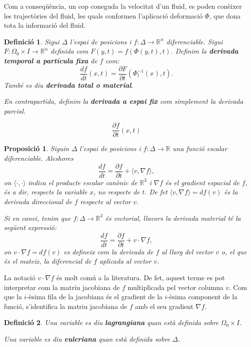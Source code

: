 \documentclass{article}
\numberwithin{equation}{section}
\newtheorem{definicio}{Definici\'{o}}[section]
\newtheorem{proposicio}{Proposici\'{o}}[section]
\begin{document}
Com a conseq\"{u}\`{e}ncia, un cop coneguda la velocitat d'un fluid, es poden con\`{e}ixer les traject\`{o}ries del fluid, les quals conformen l'aplicaci\'{o} deformaci\'{o} $\Phi$, que dona tota la informaci\'{o} del fluid.

\begin{definicio}\label{Def: derivada material}
Sigui $\Delta$ l'espai de posicions i $f:\Delta\rightarrow\mathbb{R}^n$ diferenciable. Sigui $F:\Omega_0\times I\rightarrow\mathbb{R}^n$ definida com $F(y,t)=f(\Phi(y,t),t)$. Definim la \textbf{derivada temporal a part\'{i}cula fixa} de $f$ com:
\[\frac{df}{dt}(x,t)=\frac{\partial F}{\partial t}(\Phi_t^{-1}(x),t).\]
Tamb\'{e} es diu \textbf{derivada total o material}.

En contrapartida, definim la \textbf{derivada a espai fix} com simplement la derivada parcial.

\[\frac{\partial f}{\partial t}(x,t)\]
\end{definicio}

\begin{proposicio}
Siguin $\Delta$ l'espai de posicions i $f:\Delta\rightarrow\mathbb{R}$ una funci\'{o} escalar diferenciable. Aleshores
\[\frac{df}{dt}=\frac{\partial f}{\partial t}+\langle v,\nabla f\rangle,\]
on $\langle\cdot,\cdot\rangle$ indica el producte escalar can\`{o}nic de $\mathbb{R}^3$ i $\nabla f$ \'{e}s el gradient espacial de $f$, \'{e}s a dir, respecte la variable $x$, no respecte de $t$. De fet $\langle v,\nabla f\rangle=df(v)$ \'{e}s la derivada direccional de $f$ respecte al vector $v$.

Si en canvi, tenim que $f:\Delta\rightarrow\mathbb{R}^3$ \'{e}s vectorial, llavors la derivada material t\'{e} la seg\"{u}ent expressi\'{o}:
\[\frac{df}{dt}=\frac{\partial f}{\partial t}+v\cdot\nabla f,\]
on $v\cdot\nabla f=df(v)$ es defineix com la derivada de $f$ al llarg del vector $v$ o, el que \'{e}s el mateix, la diferencial de $f$ aplicada al vector $v$.
\end{proposicio}

La notaci\'{o} $v\cdot\nabla f$ \'{e}s molt com\'{u} a la literatura. De fet, aquest terme es pot interpretar com la matriu jacobiana de $f$ multiplicada pel vector columna $v$. Com que la $i$-\`{e}sima fila de la jacobiana \'{e}s el gradient de la $i$-\`{e}sima component de la funci\'{o}, s'identifica la matriu jacobiana de $f$ amb el seu gradient $\nabla f$.

\begin{definicio}
Una variable es diu \textbf{lagrangiana} quan est\`{a} definida sobre $\Omega_0\times I$.

Una variable es diu \textbf{euleriana} quan est\`{a} definida sobre $\Delta$.
\end{definicio}
\end{document}
